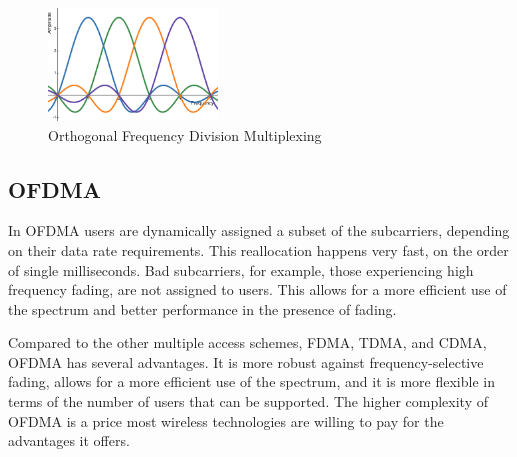 \begin{figure}[H]
	\centering
	\includegraphics[width=0.4\textwidth]{Figures/ofdm.png}
	\caption{Orthogonal Frequency Division Multiplexing}
\end{figure}

\subsection{OFDMA}

In OFDMA users are dynamically assigned a subset of the subcarriers, depending on their data rate requirements. This reallocation happens very fast, on the order of single milliseconds. Bad subcarriers, for example, those experiencing high frequency fading, are not assigned to users. This allows for a more efficient use of the spectrum and better performance in the presence of fading.

Compared to the other multiple access schemes, FDMA, TDMA, and CDMA, OFDMA has several advantages. It is more robust against frequency-selective fading, allows for a more efficient use of the spectrum, and it is more flexible in terms of the number of users that can be supported. The higher complexity of OFDMA is a price most wireless technologies are willing to pay for the advantages it offers.